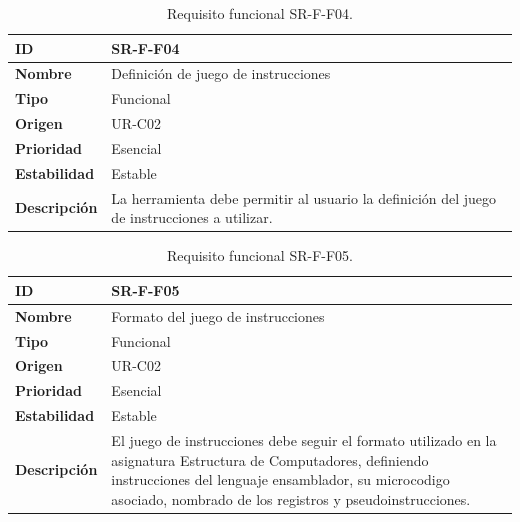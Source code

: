 \begin{center}
\begin{table}[htbp]
\centering
\caption{Requisito funcional SR-F-F04.}
\begin{tabular}{@{}p{2.5cm} p{9cm}@{}} 
\toprule
\textbf{ID} 				& SR-F-F04 \\
\midrule
\textbf{Nombre} 			& Definición de juego de instrucciones \\
\midrule
\textbf{Tipo} 			& Funcional \\
\midrule
\textbf{Origen} 			& UR-C02 \\
\midrule
\textbf{Prioridad}		& Esencial \\
\midrule
\textbf{Estabilidad} 		& Estable \\
\midrule
\textbf{Descripción} 	& La herramienta debe permitir al usuario la definición del juego de instrucciones a utilizar.\\
\bottomrule
\end{tabular}
\label{tab:srff04}
\end{table}
\end{center}

\begin{center}
\begin{table}[htbp]
\centering
\caption{Requisito funcional SR-F-F05.}
\begin{tabular}{@{}p{2.5cm} p{9cm}@{}} 
\toprule
\textbf{ID} 				& SR-F-F05 \\
\midrule
\textbf{Nombre} 			& Formato del juego de instrucciones\\
\midrule
\textbf{Tipo} 			& Funcional \\
\midrule
\textbf{Origen} 			& UR-C02 \\
\midrule
\textbf{Prioridad}		& Esencial \\
\midrule
\textbf{Estabilidad} 		& Estable \\
\midrule
\textbf{Descripción} 	& El juego de instrucciones debe seguir el formato utilizado en la asignatura Estructura de Computadores, definiendo instrucciones del lenguaje \gls{ensamblador}, su \gls{microcodigo} asociado, nombrado de los registros y pseudoinstrucciones. \\
\bottomrule
\end{tabular}
\label{tab:srff05}
\end{table}
\end{center}

